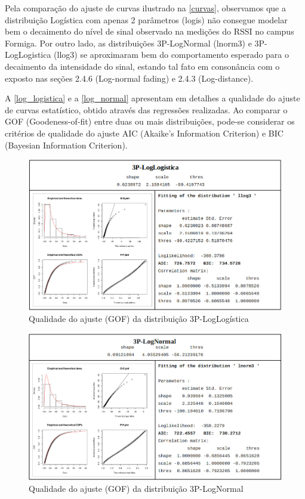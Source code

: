 \documentclass[
	12pt,				%
	openright,			%
	twoside,			%
	a4paper,			%
	english,			%
	french,				%
	spanish,			%
	brazil				%
	]{abntex2}
\begin{document}
Pela comparação do ajuste de curvas ilustrado na \autoref{curvas}, observamos que a distribuição Logística com apenas 2 parâmetros (logis) não consegue modelar bem o decaimento do nível de sinal observado na medições do RSSI no campus Formiga. Por outro lado, as distribuições 3P-LogNormal (lnorm3) e 3P-LogLogistica (llog3) se aproximaram bem do comportamento esperado para o decaimento da intensidade do sinal, estando tal fato em consonância com o exposto nas seções 2.4.6 (Log-normal fading) e 2.4.3 (Log-distance).
 
A \autoref{log_logistica} e a \autoref{log_normal} apresentam em detalhes a qualidade do ajuste de curvas estatístico, obtido através das regressões realizadas. Ao comparar o GOF (Goodeness-of-fit) entre duas ou mais distribuições, pode-se considerar os critérios de qualidade do ajuste AIC (Akaike's Information Criterion) e BIC (Bayesian Information Criterion).

\begin{figure}[htb]
	\caption{\label{log_logistica} Qualidade do ajuste (GOF) da distribuição 3P-LogLogística}
	\begin{center}
		\includegraphics[scale=0.47]{images/log-logistica.jpg}
	\end{center}
\end{figure}

\begin{figure}[htb]
	\caption{\label{log_normal} Qualidade do ajuste (GOF) da distribuição 3P-LogNormal}
	\begin{center}
		\includegraphics[scale=0.47]{images/log-normal.jpg}
	\end{center}
\end{figure}
\end{document}
